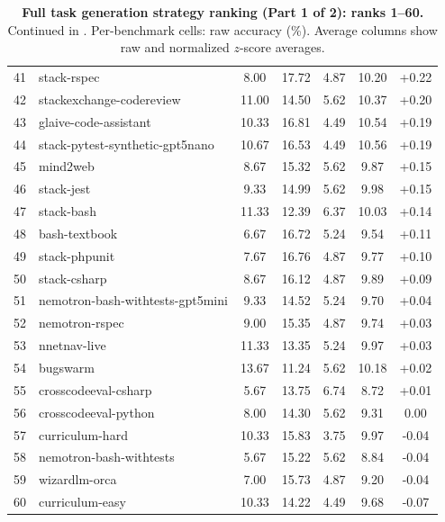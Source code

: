 \documentclass{llmxive}
\begin{document}
\begin{table}[!htbp]
\begin{tabular}{rlccccc}
41 & stack-rspec                    &  8.00 & 17.72 &  4.87 & 10.20 & +0.22 \\
42 & stackexchange-codereview       & 11.00 & 14.50 &  5.62 & 10.37 & +0.20 \\
43 & glaive-code-assistant          & 10.33 & 16.81 &  4.49 & 10.54 & +0.19 \\
44 & stack-pytest-synthetic-gpt5nano & 10.67 & 16.53 &  4.49 & 10.56 & +0.19 \\
45 & mind2web                       &  8.67 & 15.32 &  5.62 &  9.87 & +0.15 \\
46 & stack-jest                     &  9.33 & 14.99 &  5.62 &  9.98 & +0.15 \\
47 & stack-bash                     & 11.33 & 12.39 &  6.37 & 10.03 & +0.14 \\
48 & bash-textbook                  &  6.67 & 16.72 &  5.24 &  9.54 & +0.11 \\
49 & stack-phpunit                  &  7.67 & 16.76 &  4.87 &  9.77 & +0.10 \\
50 & stack-csharp                   &  8.67 & 16.12 &  4.87 &  9.89 & +0.09 \\
51 & nemotron-bash-withtests-gpt5mini &  9.33 & 14.52 & 5.24 & 9.70 & +0.04 \\
52 & nemotron-rspec                 &  9.00 & 15.35 &  4.87 &  9.74 & +0.03 \\
53 & nnetnav-live                   & 11.33 & 13.35 &  5.24 &  9.97 & +0.03 \\
54 & bugswarm                       & 13.67 & 11.24 &  5.62 & 10.18 & +0.02 \\
55 & crosscodeeval-csharp           &  5.67 & 13.75 &  6.74 &  8.72 & +0.01 \\
56 & crosscodeeval-python           &  8.00 & 14.30 &  5.62 &  9.31 &  0.00 \\
57 & curriculum-hard                & 10.33 & 15.83 &  3.75 &  9.97 & -0.04 \\
58 & nemotron-bash-withtests        &  5.67 & 15.22 &  5.62 &  8.84 & -0.04 \\
59 & wizardlm-orca                  &  7.00 & 15.73 &  4.87 &  9.20 & -0.04 \\
60 & curriculum-easy                & 10.33 & 14.22 &  4.49 &  9.68 & -0.07 \\
\bottomrule
\end{tabular}
\vspace{10pt}
\caption{\textbf{Full task generation strategy ranking (Part 1 of 2): ranks 1--60.} Continued in . Per-benchmark cells: raw accuracy (\%). Average columns show raw and normalized $z$-score averages.}
\label{tab:task_gen_full_part1}
\end{table}
\FloatBarrier
\end{document}
